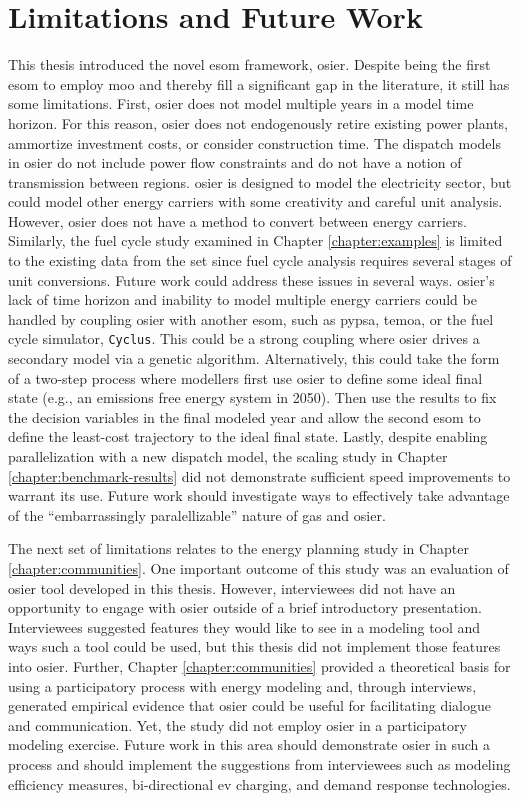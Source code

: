 \section{Limitations and Future Work}
\label{section:limitations-future-work}
This thesis introduced the novel \ac{esom} framework, \ac{osier}. Despite being
the first \ac{esom} to employ \ac{moo} and thereby fill a significant gap in the
literature, it still has some limitations. First, \ac{osier} does not model
multiple years in a model time horizon. For this reason, \ac{osier} does not
endogenously retire existing power plants, ammortize investment costs, or
consider construction time. The dispatch models in \ac{osier} do not include
power flow constraints and do not have a notion of transmission between regions.
\ac{osier} is designed to model the electricity sector, but could model other
energy carriers with some creativity and careful unit analysis. However,
\ac{osier} does not have a method to convert between energy carriers. Similarly,
the fuel cycle study examined in Chapter \ref{chapter:examples} is limited to
the existing data from the \acf{set} since fuel cycle analysis requires several
stages of unit conversions. Future work could address these issues in several
ways. \ac{osier}'s lack of time horizon and inability to model multiple energy
carriers could be handled by coupling \ac{osier} with another \ac{esom}, such as
\ac{pypsa}, \ac{temoa}, or the fuel cycle simulator, \texttt{Cyclus}. This could
be a strong coupling where \ac{osier} drives a secondary model via a genetic
algorithm. Alternatively, this could take the form of a two-step process where
modellers first use \ac{osier} to define some ideal final state (e.g., an
emissions free energy system in 2050). Then use the results to fix the decision
variables in the final modeled year and allow the second \ac{esom} to define the
least-cost trajectory to the ideal final state. Lastly, despite enabling
parallelization with a new dispatch model, the scaling study in Chapter
\ref{chapter:benchmark-results} did not demonstrate sufficient speed
improvements to warrant its use. Future work should investigate ways to
effectively take advantage of the ``embarrassingly paralellizable'' nature of
\acp{ga} and \ac{osier}.

The next set of limitations relates to the energy planning study in Chapter
\ref{chapter:communities}. One important outcome of this study was an evaluation
of \ac{osier} tool developed in this thesis. However, interviewees did not have
an opportunity to engage with \ac{osier} outside of a brief introductory
presentation. Interviewees suggested features they would like to see in a
modeling tool and ways such a tool could be used, but this thesis did not
implement those features into \ac{osier}. Further, Chapter
\ref{chapter:communities} provided a theoretical basis for using a participatory
process with energy modeling and, through interviews, generated empirical
evidence that \ac{osier} could be useful for facilitating dialogue and
communication. Yet, the study did not employ \ac{osier} in a participatory
modeling exercise. Future work in this area should demonstrate \ac{osier} in
such a process and should implement the suggestions from interviewees such as
modeling efficiency measures, bi-directional \ac{ev} charging, and demand
response technologies.
